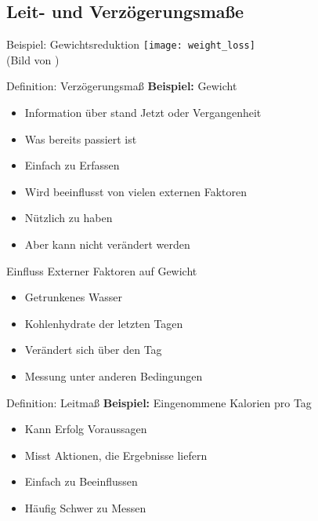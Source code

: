 \subsection{Leit- und Verzögerungsmaße}


\begin{frame}[c]{Beispiel: Gewichtsreduktion}
    \texttt{[image: weight\_loss]} \\
    (Bild von \cite{weight-loss-pic})
\end{frame}

\begin{frame}[c]{Definition: Verzögerungsmaß}
    \large
    \pause
    \textbf{Beispiel:} Gewicht
    \begin{itemize}[<+(1)->]
        \item Information über stand Jetzt oder Vergangenheit
        \item Was bereits passiert ist
        \item Einfach zu Erfassen
        \item Wird beeinflusst von vielen externen Faktoren
        \item Nützlich zu haben
        \item Aber kann nicht verändert werden
    \end{itemize}
\end{frame}


\begin{frame}[c]{Einfluss Externer Faktoren auf Gewicht}
    \large
    \begin{itemize}[<+(1)->]
        \item Getrunkenes Wasser
        \item Kohlenhydrate der letzten Tagen
        \item Verändert sich über den Tag
        \item Messung unter anderen Bedingungen
    \end{itemize}
\end{frame}

\begin{frame}[c]{Definition: Leitmaß}
    \large
    \pause
    \textbf{Beispiel:} Eingenommene Kalorien pro Tag
    \begin{itemize}[<+(1)->]
        \item Kann Erfolg Voraussagen
        \item Misst Aktionen, die Ergebnisse liefern
        \item Einfach zu Beeinflussen
        \item Häufig Schwer zu Messen
    \end{itemize}
\end{frame}


